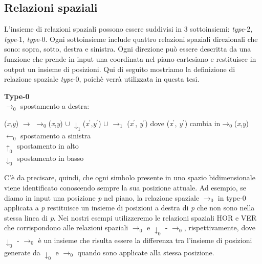 \subsection{Relazioni spaziali}
L'insieme di relazioni spaziali \cite{pubblicazione: tomita} possono essere suddivisi in 3 sottoinsiemi: \textit{type}-2, \textit{type}-1, \textit{type}-0. Ogni sottoinsieme include quattro relazioni spaziali direzionali che sono: sopra, sotto, destra e sinistra. Ogni direzione può essere descritta da una funzione che prende in input una coordinata nel piano cartesiano e restituisce in output un insieme di posizioni. Qui di seguito mostriamo la definizione di relazione spaziale \textit{type}-0, poichè verrà utilizzata in questa tesi.
\begin{flushleft}
	\vspace{0.2cm}\noindent \textbf{Type-0}  \\
	$\to_0$  spostamento a destra: \par 
	(\textit{x},\textit{y}) $\to$   $\to_0$(\textit{x},\textit{y})  $\cup$ $\downarrow_1$(\textit{x}$^{'}$,\textit{y}$^{'}$) $\cup$ $\to_1$ (\textit{x}$^{'}$, \textit{y}$^{'}$) dove (\textit{x}$^{'}$, \textit{y}$^{'}$) cambia in$\to_0$(\textit{x},\textit{y})\\
	$\gets_0$ spostamento  a sinistra \\
	$\uparrow_0$ spostamento in alto \\
	$\downarrow_0$ spostamento in basso 
\end{flushleft}
C'è da precisare, quindi, che ogni simbolo presente in uno spazio bidimensionale viene identificato conoscendo sempre la sua posizione attuale. Ad esempio, se diamo in input una posizione \textit{p} nel piano, la relazione spaziale $\to_0$ in type-0 applicata a \textit{p} restituisce un insieme di posizioni a destra di \textit{p} che non sono nella stessa linea di \textit{p}.
Nei nostri esempi utilizzeremo le relazioni spaziali HOR e VER che corrispondono alle relazioni spaziali $\to_0$ e $\downarrow_0$ - $\to_0$, rispettivamente, dove $\downarrow_0$ - $\to_0$ è un insieme che risulta essere la differenza tra l'insieme di posizioni generate da $\downarrow_0$ e $\to_0$ quando sono applicate alla stessa posizione. 

